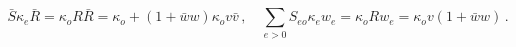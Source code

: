 \begin{equation}
\bar{S}\kappa _{e}\bar{R}=\kappa _{o}R\bar{R}=\kappa _{o}+(1+\bar{w}w)\kappa
_{o}v\bar{v}\,,\quad \sum_{e>0}S_{eo}\kappa _{e}w_{e}=\kappa
_{o}Rw_{e}=\kappa _{o}v(1+\bar{w}w)\,.
\end{equation}

